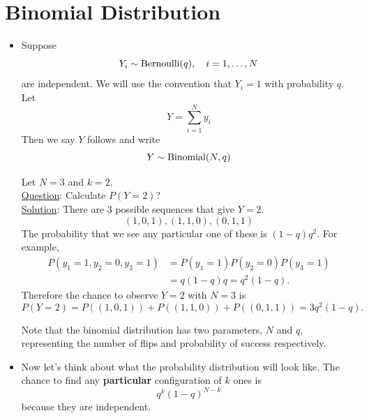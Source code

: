   \section{Binomial Distribution}
  \begin{itemize}
  \item Suppose 
  \begin{equation*}
  Y_i \sim {\rm Bernoulli}(q),\quad i =1,\dots, N
  \end{equation*} 
  are independent. We will use the convention that $Y_i=1$ with probability $q$. Let
\begin{equation*}
Y = \sum_{i=1}^N y_i
\end{equation*}
 Then we say $Y$ follows  and write
\begin{equation*}
Y \sim {\rm Binomial}(N,q)
\end{equation*}

 
 
 \begin{example}
Let $N=3$ and $k=2$. \\

\noindent
\underline{Question}: Calculate $P(Y=2)$?\\

\noindent
\underline{Solution}: There are 3 possible sequences that give $Y=2$. 
\begin{equation*}
(1,0,1),(1,1,0),(0,1,1)
\end{equation*}
The probability that we see any particular one of these is $(1-q)q^2$. For example, 
\begin{align*}
P(y_1 = 1,y_2 = 0,y_3 = 1) &= P(y_1 = 1)P(y_2=0)P(y_3 =1) \\
&= q(1-q)q = q^2(1-q).
\end{align*}
Therefore the chance to observe $Y=2$ with $N=3$ is
\begin{equation*}
P(Y=2) = P((1,0,1)) +P((1,1,0))  + P((0,1,1))  =  3q^2(1-q). 
\end{equation*}


 \end{example}
 
 Note that the binomial distribution has two parameters, $N$ and $q$, representing the number of flips and probability of success respectively. 
\item Now let's think about what the probability distribution will look like. The chance to find any {\bf particular} configuration of $k$ ones is 
\begin{equation*}
q^k(1-q)^{N-k}
\end{equation*}
 because they are independent. \\
 

\end{itemize}
